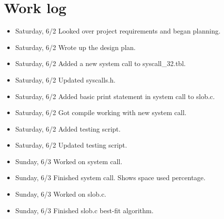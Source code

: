 \documentclass[journal,10pt,onecolumn,letterpaper,draftclsnofoot]{IEEEtran}
\begin{document}
\section{Work log}

\begin{itemize}
\item Saturday, 6/2 Looked over project requirements and began planning.
\item Saturday, 6/2 Wrote up the design plan.
\item Saturday, 6/2 Added a new system call to syscall\_32.tbl.
\item Saturday, 6/2 Updated syscalls.h.
\item Saturday, 6/2 Added basic print statement in system call to slob.c.
\item Saturday, 6/2 Got compile working with new system call.
\item Saturday, 6/2 Added testing script.
\item Saturday, 6/2 Updated testing script.
\item Sunday, 6/3 Worked on system call.
\item Sunday, 6/3 Finished system call. Shows space used percentage.
\item Sunday, 6/3 Worked on slob.c.
\item Sunday, 6/3 Finished slob.c best-fit algorithm.
\end{itemize}
\end{document}
